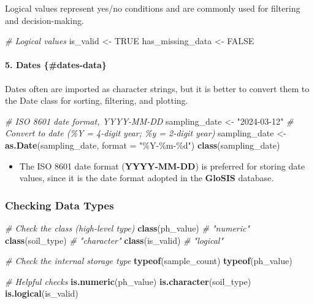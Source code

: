 \documentclass[
  10pt,
  b5paper,
  oneside]{book}
\newenvironment{Shaded}{\begin{snugshade}}{\end{snugshade}}
\newcommand{\AttributeTok}[1]{\textcolor[rgb]{0.13,0.29,0.53}{#1}}
\newcommand{\CommentTok}[1]{\textcolor[rgb]{0.56,0.35,0.01}{\textit{#1}}}
\newcommand{\ConstantTok}[1]{\textcolor[rgb]{0.56,0.35,0.01}{#1}}
\newcommand{\FunctionTok}[1]{\textcolor[rgb]{0.13,0.29,0.53}{\textbf{#1}}}
\newcommand{\NormalTok}[1]{#1}
\newcommand{\OtherTok}[1]{\textcolor[rgb]{0.56,0.35,0.01}{#1}}
\newcommand{\StringTok}[1]{\textcolor[rgb]{0.31,0.60,0.02}{#1}}
\providecommand{\tightlist}{%
  \setlength{\itemsep}{0pt}\setlength{\parskip}{0pt}}
\begin{document}
Logical values represent yes/no conditions and are commonly used for filtering and decision-making.

\begin{Shaded}
\begin{Highlighting}[]
\CommentTok{\# Logical values}
\NormalTok{is\_valid }\OtherTok{\textless{}{-}} \ConstantTok{TRUE}
\NormalTok{has\_missing\_data }\OtherTok{\textless{}{-}} \ConstantTok{FALSE}
\end{Highlighting}
\end{Shaded}

\paragraph*{5. Dates \{\#dates-data\}}\label{dates-dates-data}

Dates often are imported as character strings, but it is better to convert them to the Date class for sorting, filtering, and plotting.

\begin{Shaded}
\begin{Highlighting}[]
\CommentTok{\# ISO 8601 date format, YYYY{-}MM{-}DD}
\NormalTok{sampling\_date }\OtherTok{\textless{}{-}} \StringTok{"2024{-}03{-}12"}
\CommentTok{\# Convert to date (\%Y = 4{-}digit year; \%y = 2{-}digit year)}
\NormalTok{sampling\_date }\OtherTok{\textless{}{-}} \FunctionTok{as.Date}\NormalTok{(sampling\_date, }\AttributeTok{format =} \StringTok{"\%Y{-}\%m{-}\%d"}\NormalTok{)}
\FunctionTok{class}\NormalTok{(sampling\_date)}
\end{Highlighting}
\end{Shaded}

\begin{itemize}
\tightlist
\item
  The ISO 8601 date format (\textbf{YYYY-MM-DD}) is preferred for storing date values, since it is the date format adopted in the \textbf{GloSIS} database.
\end{itemize}

\subsubsection{Checking Data Types}\label{check-data}

\begin{Shaded}
\begin{Highlighting}[]
\CommentTok{\# Check the class (high{-}level type)}
\FunctionTok{class}\NormalTok{(ph\_value)   }\CommentTok{\# "numeric"}
\FunctionTok{class}\NormalTok{(soil\_type)  }\CommentTok{\# "character"}
\FunctionTok{class}\NormalTok{(is\_valid)   }\CommentTok{\# "logical"}

\CommentTok{\# Check the internal storage type}
\FunctionTok{typeof}\NormalTok{(sample\_count)}
\FunctionTok{typeof}\NormalTok{(ph\_value)}

\CommentTok{\# Helpful checks}
\FunctionTok{is.numeric}\NormalTok{(ph\_value)}
\FunctionTok{is.character}\NormalTok{(soil\_type)}
\FunctionTok{is.logical}\NormalTok{(is\_valid)}
\end{Highlighting}
\end{Shaded}
\end{document}
